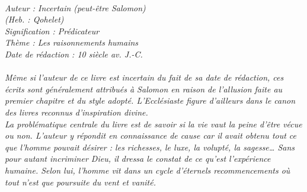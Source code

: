 \BFont
\noindent\hrulefill
{\footnotesize
\textit{
\bigskip
{\centering{}
\\Auteur : Incertain (peut-être Salomon)
\\(Heb. : Qohelet)
\\Signification : Prédicateur
\\Thème : Les raisonnements humains
\\Date de rédaction : 10 siècle av. J.-C.\\}
}
\textit{
\\Même si l'auteur de ce livre est incertain du fait de sa date de rédaction, ces écrits sont généralement attribués à Salomon en raison de l'allusion faite au premier chapitre et du style adopté. L'Ecclésiaste figure d'ailleurs dans le canon des livres reconnus d'inspiration divine.
\\La problématique centrale du livre est de savoir si la vie vaut la peine d'être vécue ou non. L'auteur y répondit en connaissance de cause car il avait obtenu tout ce que l'homme pouvait désirer : les richesses, le luxe, la volupté, la sagesse… Sans pour autant incriminer Dieu, il dressa le constat de ce qu'est l'expérience humaine. Selon lui, l'homme vit dans un cycle d'éternels recommencements où tout n'est que poursuite du vent et vanité. 
}
}
\par\nobreak\noindent\hrulefill

